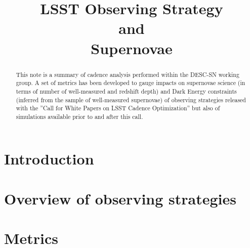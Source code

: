 \documentclass[\docopts]{\docclass}
\begin{document}
\title{LSST Observing Strategy \\ and  \\Supernovae}
\maketitlepre


\begin{abstract}

 This note is a summary of cadence analysis performed within the DESC-SN working group.  A set of metrics has been developed to gauge impacts on supernovae science (in terms of number of well-measured and redshift depth) and Dark Energy constraints (inferred from the sample of well-measured supernovae) of observing strategies released with the ''Call for White Papers on LSST Cadence Optimization'' but also of simulations available prior to and after this call. 
\end{abstract}

\dockeys{}

\maketitlepost

\clearpage
\tableofcontents

\section{Introduction}
\label{sec:intro}



\section{Overview of observing strategies}
\label{sec:overview}



\section{Metrics}
\label{sec:metricsmain}












\end{document}
